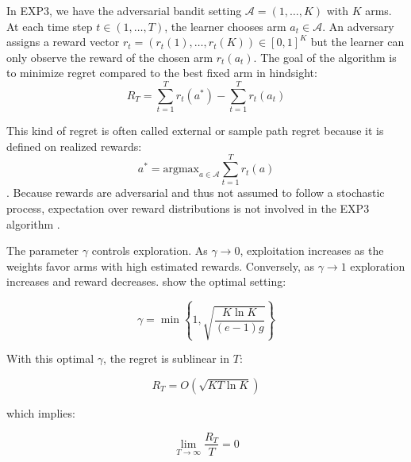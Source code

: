 In EXP3, we have the adversarial bandit setting \( \mathcal{A} = ({1, \dots, K}) \) with \(K\) arms. At each time step \(t \in ({1, \dots, T})\), the learner chooses arm \(a_t \in \mathcal{A}\). An adversary assigns a reward vector \(r_t = (r_t(1), \dots, r_t(K)) \in [0,1]^K\) but the learner can only observe the reward of the chosen arm \(r_t(a_t)\). The goal of the algorithm is to minimize regret compared to the best fixed arm in hindsight: \[R_T = \sum_{t=1}^T r_t(a^*) - \sum_{t=1}^T r_t(a_t)\]

This kind of regret is often called external or sample path regret because it is defined on realized rewards: 
\begin{equation}\label{eq:best_arm}
a^* =  \text{argmax}_{a \in \mathcal{A}} \sum_{t=1}^T r_t(a)
\end{equation}
\citep{blum2007external}. Because rewards are adversarial and thus not assumed to follow a stochastic process, expectation over reward distributions is not involved in the EXP3 algorithm \citep{auer2002exp3}.

The parameter \(\gamma\) controls exploration. As \(\gamma \rightarrow 0\), exploitation increases as the weights favor arms with high estimated rewards. Conversely, as \(\gamma \rightarrow 1\) exploration increases and reward decreases. \cite{auer2002exp3} show the optimal setting: 

\begin{equation}\label{eq:gamma}
\gamma = \min \left\{1, \sqrt{\frac{K \ln K}{(e-1)g}}\right\}
\end{equation}

With this optimal \(\gamma\), the regret is sublinear in \(T\):

\begin{equation}\label{eq:exp3_sublinear}
R_T = O(\sqrt{KT\ln K})
\end{equation}

which implies:

\begin{equation}\label{eq:average_regret}
\lim_{T \rightarrow \infty} \frac{R_T}{T} = 0
\end{equation}

